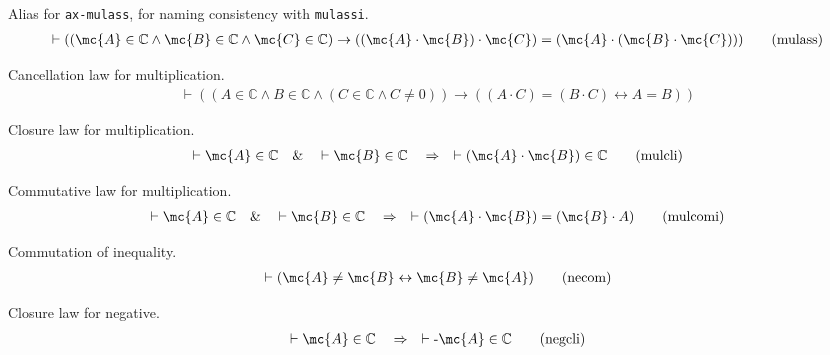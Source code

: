 \begin{lemma} {Alias for {\tt ax-mulass}}, for naming
consistency with {\tt mulassi}.
\begin{align}
\vdash ( ( \mc{A} \in \mathbb{C} \wedge \mc{B} \in \mathbb{C} \wedge \mc{C} \in \mathbb{C} )
    \rightarrow ( ( \mc{A} \cdot \mc{B} ) \cdot \mc{C} ) = ( \mc{A} \cdot ( \mc{B} \cdot \mc{C} ) )
    )\label{eq:mulass}\tag{mulass}
\end{align}
\end{lemma}


\begin{lemma} {Cancellation law for multiplication.} 
\begin{align}
\vdash ( ( A \in \mathbb{C} \wedge B \in \mathbb{C} \wedge ( C \in \mathbb{C}
    \wedge C \ne 0 ) ) \rightarrow ( ( A \cdot C ) = ( B \cdot C )
    \leftrightarrow A = B ) )\label{eq:mulcan2}\tag{mulcan2}
\end{align}
\end{lemma}


\begin{lemma} {Closure law for multiplication.} 
\begin{align}
\vdash \mc{A} \in \mathbb{C}\quad\&\quad \vdash \mc{B} \in
    \mathbb{C}\quad\Rightarrow\quad \vdash ( \mc{A} \cdot \mc{B} ) \in
    \mathbb{C}\label{eq:mulcli}\tag{mulcli}
\end{align}
\end{lemma}


\begin{lemma} {Commutative law for multiplication.} 
\begin{align}
\vdash \mc{A} \in \mathbb{C}\quad\&\quad \vdash \mc{B} \in
    \mathbb{C}\quad\Rightarrow\quad \vdash ( \mc{A} \cdot \mc{B} ) = ( \mc{B} \cdot A
    )\label{eq:mulcomi}\tag{mulcomi}
\end{align}
\end{lemma}


\begin{lemma} Commutation of inequality.  
\begin{align}
\vdash ( \mc{A} \ne \mc{B} \leftrightarrow \mc{B} \ne \mc{A} )\label{eq:necom}\tag{necom}
\end{align}
\end{lemma}


\begin{lemma} {Closure law for negative.} 
\begin{align}
\vdash \mc{A} \in \mathbb{C}\quad\Rightarrow\quad \vdash \textrm{-} \mc{A} \in
    \mathbb{C}\label{eq:negcli}\tag{negcli}
\end{align}
\end{lemma}


